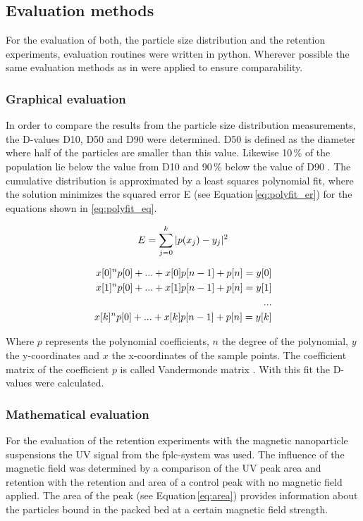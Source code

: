 \subsection{Evaluation methods}
\label{subsec:Eval}
For the evaluation of both, the particle size distribution and the retention experiments, evaluation routines were written in python. Wherever possible the same evaluation methods as in \cite{AndreMaster} were applied to ensure comparability. 

\subsubsection{Graphical evaluation}
\label{subsubsec:Graph_eval}
In order to compare the results from the particle size distribution measurements, the D-values D10, D50 and D90 were determined. D50 is defined as the diameter where half of the particles are smaller than this value. Likewise 10\,\% of the population lie below the value from D10 and 90\,\% below the value of D90 \cite{merkus2009particle}. The cumulative distribution is  approximated by a least squares polynomial fit, where the solution minimizes the squared error E (see Equation\,\ref{eq:polyfit_er}) for the equations shown in \ref{eq:polyfit_eq}.  

\begin{equation}
\label{eq:polyfit_er}
\centering
E = \sum_{j=0}^{k}\vert p(x_{j})-y_{j}\vert^{2}
\end{equation}

\begin{equation}
\label{eq:polyfit_eq}
\centering
\begin{split}
x[0]^{n}p[0] + ... + x[0]p[n-1] + p[n] = y[0] \\
x[1]^{n}p[0] + ... + x[1]p[n-1] + p[n] = y[1]  \\
... \\ 
x[k]^{n}p[0] + ... + x[k]p[n-1] + p[n] = y[k]
\end{split}
\end{equation}

Where $p$ represents the polynomial coefficients, $n$ the degree of the polynomial, $y$ the y-coordinates and $x$ the x-coordinates of the sample points. The coefficient matrix of the coefficient $p$ is called Vandermonde matrix \cite{bjorck1970solution}. With this fit the D-values were calculated. 

\subsubsection{Mathematical evaluation}
\label{subsubsec:Math_eval}
For the evaluation of the retention experiments with the magnetic nanoparticle suspensions the UV signal from the \gls{fplc}-system was used. The influence of the magnetic field was determined by a comparison of the UV peak area and retention with the retention and area of a control peak with no magnetic field applied. The area of the peak (see Equation\,\ref{eq:area}) provides information about the particles bound in the packed bed at a certain magnetic field strength.    

